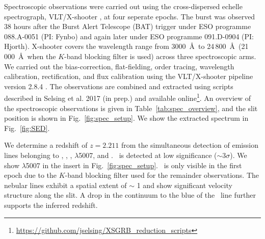 \documentclass{aa}    %
\begin{document}
Spectroscopic observations were carried out using the cross-dispersed echelle
spectrograph, VLT/X-shooter \citep{Vernet2011}, at four seperate epochs. The
burst was observed 38 hours after the Burst Alert Telescope (BAT) trigger under
ESO programme 088.A-0051 (PI: Fynbo) and again later under ESO programme
091.D-0904 (PI: Hjorth). X-shooter covers the wavelength range from 3000~\AA~to
24\,800~\AA~(21\,000~\AA~when the $K$-band blocking filter is used) across three
spectroscopic arms. We carried out the bias-correction, flat-fielding, order
tracing, wavelength calibration, rectification, and flux calibration using the
VLT/X-shooter pipeline version 2.8.4 \citep{Modigliani2010}.
The observations are combined and extracted using scripts described in Selsing
et al. 2017 (in prep.) and available
online\footnote{\url{https://github.com/jselsing/XSGRB_reduction_scripts}}. 
An overview of the spectroscopic observations is given in
Table~\ref{tab:spec_overview}, and the slit position is shown in
Fig.~\ref{fig:spec_setup}. We show the extracted spectrum in Fig.~\ref{fig:SED}.

We determine a redshift of $z = 2.211$ from the simultaneous detection of
emission lines belonging to \lya, \oii, \hb, \oiii$\lambda$5007, and \ha. 
\hb~is detected at low significance ($\sim 3 \sigma$). We show \oiii$\lambda$5007
in the insert in Fig.~\ref{fig:spec_setup}.  \ha~is only visible in the first
epoch due to the $K$-band blocking filter used for the remainder observations.
The nebular lines exhibit a spatial extent of $\sim$ 1 and show
significant velocity structure along the slit. A drop in the continuum to the
blue of the \lya~line further supports the inferred redshift.

\end{document}
